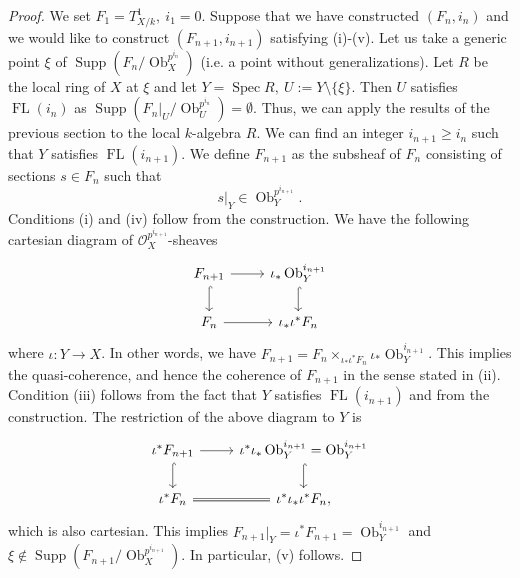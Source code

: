 \documentclass[10pt,a4paper]{amsart}
\newcommand{\FL}[1]{\operatorname{FL}(#1)}
\begin{document}
\begin{proof}
    We set $F_1=T_{X/k}^1,\ i_1=0$. Suppose that we have constructed $(F_n, i_n)$ and we would like to construct $(F_{n+1},i_{n+1})$ satisfying (i)-(v). Let us take a generic point $\xi$ of $\operatorname{Supp}(F_n/\operatorname{Ob}_X^{p^{i_n}})$ (i.e. a point without generalizations). Let $R$ be the local ring of $X$ at $\xi$ and let $Y=\operatorname{Spec}R,\ U:=Y\setminus \{\xi\}$. Then $U$ satisfies $\FL{i_n}$ as $\operatorname{Supp}(F_n|_U/\operatorname{Ob}_U^{p^{i_n}})=\emptyset$. Thus, we can apply the results of the previous section to the local $k$-algebra $R$. We can find an integer $i_{n+1}\ge i_{n}$ such that $Y$ satisfies $\FL{i_{n+1}}$. We define $F_{n+1}$ as the subsheaf of $F_n$ consisting of sections $s\in F_n$ such that $$s|_Y\in \operatorname{Ob}_Y^{p^{i_{n+1}}}.$$
    Conditions (i) and (iv) follow from the construction. We have the following cartesian diagram of $\mathcal{O}_X^{p^{i_{n+1}}}$-sheaves
\[\begin{tikzcd}
	{F_{n+1}} & {\iota_*\operatorname{Ob}_Y^{i_{n+1}}} \\
	{F_n} & {\iota_*\iota^*F_n}
	\arrow[from=1-1, to=1-2]
	\arrow[hook, from=1-1, to=2-1]
	\arrow[hook, from=1-2, to=2-2]
	\arrow[from=2-1, to=2-2]
\end{tikzcd}\]
    where $\iota: Y\to X$. In other words, we have $F_{n+1}=F_n\times_{\iota_*\iota^*F_n}\iota_*\operatorname{Ob}_Y^{i_{n+1}}$. This implies the quasi-coherence, and hence the coherence of $F_{n+1}$ in the sense stated in (ii). Condition (iii) follows from the fact that $Y$ satisfies $\FL{i_{n+1}}$ and from the construction. The restriction of the above diagram to $Y$ is
\[\begin{tikzcd}
	{\iota^*F_{n+1}} & {\iota^*\iota_*\operatorname{Ob}_Y^{i_{n+1}}=\operatorname{Ob}_Y^{i_{n+1}}} \\
	{\iota^*F_n} & {\iota^*\iota_*\iota^*F_n}
	\arrow[from=1-1, to=1-2]
	\arrow[hook, from=1-1, to=2-1]
	\arrow[hook, from=1-2, to=2-2]
	\arrow[equals, from=2-1, to=2-2],
\end{tikzcd}\]
    which is also cartesian. This implies $F_{n+1}|_Y=\iota^*F_{n+1}=\operatorname{Ob}_Y^{i_{n+1}}$ and $\xi \notin \operatorname{Supp}(F_{n+1}/\operatorname{Ob}_X^{p^{i_{n+1}}})$. In particular, (v) follows.
\end{proof}
\end{document}
